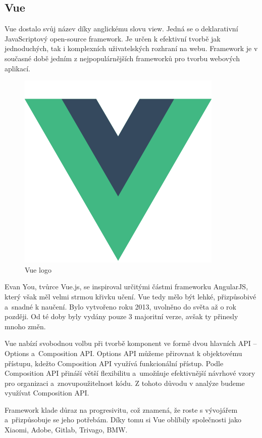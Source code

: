 \subsection{Vue}


Vue dostalo svůj název díky anglickému slovu view. Jedná se o deklarativní JavaScriptový open-source framework. 
Je určen k efektivní tvorbě jak jednoduchých, tak i komplexních uživatelských rozhraní na webu. 
Framework je v současné době jedním z nejpopulárnějších frameworků pro tvorbu webových aplikací.\cite{vuemacrae,vue}

\begin{figure}[htb]
	\centering
		\includegraphics[width=.3\textwidth]{images/vue-logo.png}
	\caption[Vue logo]{Vue logo \cite{vue}}
	\label{fig:vuelogo}
\end{figure}

Evan You, tvůrce Vue.js, se inspiroval určitými částmi frameworku AngularJS, který však měl velmi strmou křivku učení. 
Vue tedy mělo být lehké, přizpůsobivé a~snadné k naučení. Bylo vytvořeno roku 2013, uvolněno do světa až o rok později. 
Od té doby byly vydány pouze 3 majoritní verze, avšak ty přinesly mnoho změn.\cite{vueflexiple,vuemedium}

Vue nabízí svobodnou volbu při tvorbě komponent ve formě dvou hlavních API -- Options a~Composition API. 
Options API můžeme přirovnat k objektovému přístupu, kdežto Composition API využívá funkcionální přístup. 
Podle \cite{vue} Composition API přináší větší flexibilitu a~umožňuje efektivnější návrhové vzory pro organizaci a~znovupoužitelnost kódu. 
Z tohoto důvodu v analýze budeme využívat Composition API.

Framework klade důraz na progresivitu, což znamená, že roste s vývojářem a~přizpůsobuje se jeho potřebám. 
Díky tomu si Vue oblíbily společnosti jako Xiaomi, Adobe, Gitlab, Trivago, BMW.\cite{vuetriodev,vue}

